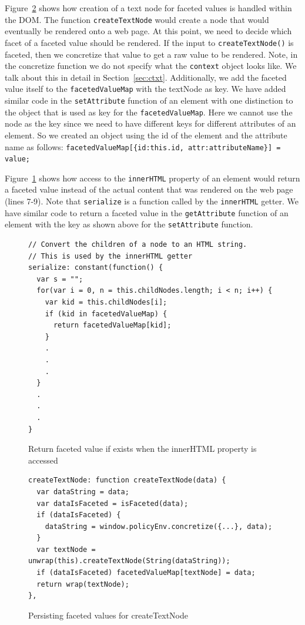 Figure~\ref{fig:createTextNode} shows how creation of a text node for faceted values
is handled within the DOM. The function \texttt{createTextNode} would create a
node that would eventually be rendered onto a web page. At this point, we need to
decide which facet of a faceted value should be rendered. If the input to
\texttt{createTextNode()} is faceted, then we concretize that value to get a raw
value to be rendered. Note, in the concretize function we do not specify what the
\texttt{context} object looks like. We talk about this in detail in
Section~\ref{sec:ctxt}. Additionally, we add the faceted value itself to the
\texttt{facetedValueMap} with the textNode as key. We have added similar code in
the \texttt{setAttribute} function of an element with one distinction to the object
that is used as key for the \texttt{facetedValueMap}. Here we cannot use the node
as the key since we need to have different keys for different attributes of an element.
So we created an object using the id of the element and the attribute name as follows:
\indent\texttt{facetedValueMap[\{id:this.id, attr:attributeName\}] = value;}
\noindent

Figure~\ref{fig:innerHTML} shows how access to the \texttt{innerHTML} property of
an element would return a faceted value instead of the actual content that was
rendered on the web page (lines 7-9). Note that \texttt{serialize} is a function
called by the \texttt{innerHTML} getter. We have similar code to return a faceted
value in the \texttt{getAttribute} function of an element with the key as shown
above for the \texttt{setAttribute} function.

\begin{figure}
  \begin{lstlisting}
// Convert the children of a node to an HTML string.
// This is used by the innerHTML getter
serialize: constant(function() {
  var s = "";
  for(var i = 0, n = this.childNodes.length; i < n; i++) {
    var kid = this.childNodes[i];
    if (kid in facetedValueMap) {
      return facetedValueMap[kid];
    }
    .
    .
    .
  }
  .
  .
  .
}
  \end{lstlisting}
  \caption{Return faceted value if exists when the innerHTML property is accessed}
  \label{fig:innerHTML}
\end{figure}

\begin{figure}
  \begin{lstlisting}
createTextNode: function createTextNode(data) {
  var dataString = data;
  var dataIsFaceted = isFaceted(data);
  if (dataIsFaceted) {
    dataString = window.policyEnv.concretize({...}, data);
  }
  var textNode = unwrap(this).createTextNode(String(dataString));
  if (dataIsFaceted) facetedValueMap[textNode] = data;
  return wrap(textNode);
},
  \end{lstlisting}
  \caption{Persisting faceted values for createTextNode}
  \label{fig:createTextNode}
\end{figure}


